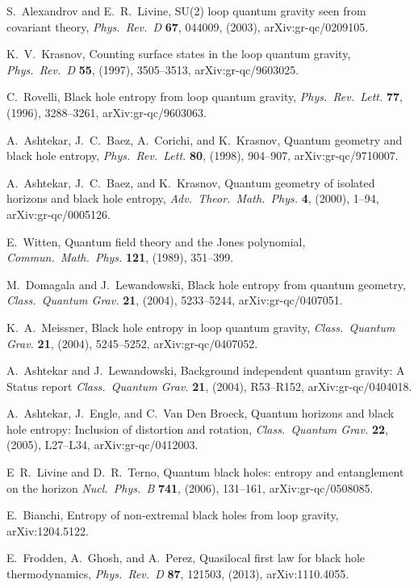 \documentclass[11pt]{article}
\begin{document}
\begin{thebibliography}{999}
 S.\ Alexandrov and E.\ R.\ Livine, SU(2) loop 
quantum gravity seen from covariant theory, \emph{Phys.\ Rev.\ D}
{\bf 67}, 044009, (2003), arXiv:gr-qc/0209105.

  K.~V.\ Krasnov, Counting surface states in the 
loop quantum gravity, \emph{Phys.\ Rev.\ D} {\bf 55}, (1997),
3505--3513, arXiv:gr-qc/9603025.

  C.\ Rovelli, Black hole entropy from loop 
quantum gravity, \emph{Phys.\ Rev.\ Lett.} {\bf 77}, (1996),
3288--3261, arXiv:gr-qc/9603063.

 A.\ Ashtekar, J.~C.\ Baez, A.\ Corichi, and K.\ Krasnov,
Quantum geometry and black hole entropy, \emph{Phys.\ Rev.\ Lett.}
{\bf 80}, (1998), 904--907, arXiv:gr-qc/9710007.

 A.\ Ashtekar, J.~C.\ Baez, and K.\ Krasnov, 
Quantum geometry of isolated horizons and black hole entropy,
\emph{Adv.\ Theor.\ Math.\ Phys.} {\bf 4}, (2000), 1--94, 
arXiv:gr-qc/0005126.

 E.\ Witten, Quantum field theory and the
Jones polynomial, \emph{Commun.\ Math.\ Phys.} {\bf 121}, 
(1989), 351--399.

 M.\ Domagala and J.\ Lewandowski, Black hole 
entropy from quantum geometry, \emph{Class.\ Quantum Grav.}
{\bf 21}, (2004), 5233--5244, arXiv:gr-qc/0407051.

 K.~A.\ Meissner, Black hole entropy in loop 
quantum gravity, \emph{Class.\ Quantum Grav.} {\bf 21},
(2004),  5245--5252, arXiv:gr-qc/0407052. 

 A.\ Ashtekar and J.\ Lewandowski, 
Background independent quantum gravity: A Status report
\emph{Class.\ Quantum Grav.} {\bf 21}, (2004), R53--R152,
arXiv:gr-qc/0404018.

 A.\ Ashtekar, J.\ Engle, and C.\ Van Den Broeck,
Quantum horizons and black hole entropy: Inclusion of distortion 
and rotation, \emph{Class.\ Quantum Grav.} {\bf 22}, (2005),
L27--L34, arXiv:gr-qc/0412003.

 E~R.\ Livine and D.~R.\ Terno, Quantum 
black holes: entropy and entanglement on the horizon
\emph{Nucl.\ Phys.\ B} {\bf 741}, (2006), 131--161,
arXiv:gr-qc/0508085.

 E.\ Bianchi, Entropy of non-extremal black holes 
from loop gravity, arXiv:1204.5122.

 E.\ Frodden, A.\ Ghosh, and A.\ Perez, Quasilocal 
first law for black hole thermodynamics, \emph{Phys.\ Rev.\ D} {\bf 87}, 
121503, (2013), arXiv:1110.4055.


\end{thebibliography}
\end{document}
